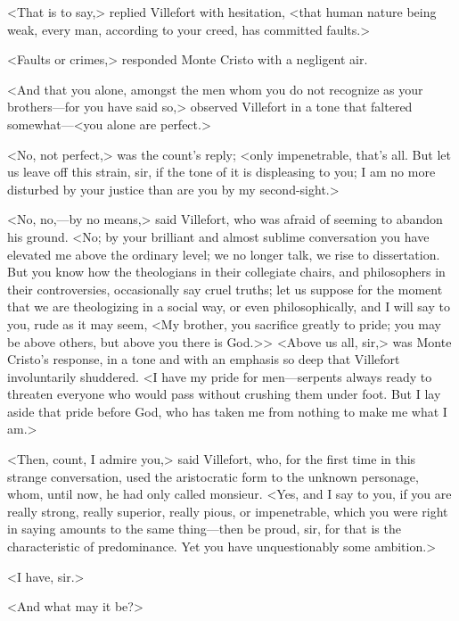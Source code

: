  <That is to say,> replied Villefort with hesitation, <that human nature being weak, every man, according to your creed, has committed faults.> 

 <Faults or crimes,> responded Monte Cristo with a negligent air. 

 <And that you alone, amongst the men whom you do not recognize as your brothers—for you have said so,> observed Villefort in a tone that faltered somewhat—<you alone are perfect.> 

 <No, not perfect,> was the count's reply; <only impenetrable, that's all. But let us leave off this strain, sir, if the tone of it is displeasing to you; I am no more disturbed by your justice than are you by my second-sight.> 

 <No, no,—by no means,> said Villefort, who was afraid of seeming to abandon his ground. <No; by your brilliant and almost sublime conversation you have elevated me above the ordinary level; we no longer talk, we rise to dissertation. But you know how the theologians in their collegiate chairs, and philosophers in their controversies, occasionally say cruel truths; let us suppose for the moment that we are theologizing in a social way, or even philosophically, and I will say to you, rude as it may seem, <My brother, you sacrifice greatly to pride; you may be above others, but above you there is God.>>  <Above us all, sir,> was Monte Cristo's response, in a tone and with an emphasis so deep that Villefort involuntarily shuddered. <I have my pride for men—serpents always ready to threaten everyone who would pass without crushing them under foot. But I lay aside that pride before God, who has taken me from nothing to make me what I am.> 

 <Then, count, I admire you,> said Villefort, who, for the first time in this strange conversation, used the aristocratic form to the unknown personage, whom, until now, he had only called monsieur. <Yes, and I say to you, if you are really strong, really superior, really pious, or impenetrable, which you were right in saying amounts to the same thing—then be proud, sir, for that is the characteristic of predominance. Yet you have unquestionably some ambition.> 

 <I have, sir.> 

 <And what may it be?> 

